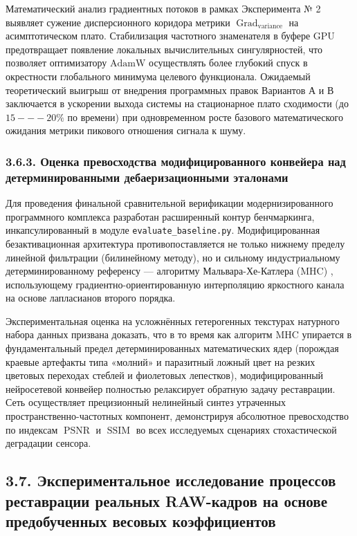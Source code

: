 \documentclass[12pt,a4paper]{article}
\begin{document}
Математический анализ градиентных потоков в рамках Эксперимента № 2 выявляет сужение дисперсионного коридора метрики $\operatorname{Grad}_{\operatorname{variance}}$ на асимптотическом плато. Стабилизация частотного знаменателя в буфере GPU предотвращает появление локальных вычислительных сингулярностей, что позволяет оптимизатору $\text{AdamW}$ осуществлять более глубокий спуск в окрестности глобального минимума целевого функционала. Ожидаемый теоретический выигрыш от внедрения программных правок Вариантов А и В заключается в ускорении выхода системы на стационарное плато сходимости (до $15---20\% $ по времени) при одновременном росте базового математического ожидания метрики пикового отношения сигнала к шуму.

\subsubsection{3.6.3. Оценка превосходства модифицированного конвейера над детерминированными дебаеризационными эталонами}

Для проведения финальной сравнительной верификации модернизированного программного комплекса разработан расширенный контур бенчмаркинга, инкапсулированный в модуле \texttt{evaluate\_baseline.py}. Модифицированная безактивационная архитектура противопоставляется не только нижнему пределу линейной фильтрации (билинейному методу), но и сильному индустриальному детерминированному референсу --- алгоритму Мальвара-Хе-Катлера ($\text{MHC}$) \cite{malvar2004high}, использующему градиентно-ориентированную интерполяцию яркостного канала на основе лапласианов второго порядка.

Экспериментальная оценка на усложнённых гетерогенных текстурах натурного набора данных призвана доказать, что в то время как алгоритм $\text{MHC}$ упирается в фундаментальный предел детерминированных математических ядер (порождая краевые артефакты типа «молний» и паразитный ложный цвет на резких цветовых переходах стеблей и фиолетовых лепестков), модифицированный нейросетевой конвейер полностью релаксирует обратную задачу реставрации. Сеть осуществляет прецизионный нелинейный синтез утраченных пространственно-частотных компонент, демонстрируя абсолютное превосходство по индексам $\operatorname{PSNR}$ и $\operatorname{SSIM}$ во всех исследуемых сценариях стохастической деградации сенсора.


\subsection{3.7. Экспериментальное исследование процессов реставрации реальных RAW-кадров на основе предобученных весовых коэффициентов}
\end{document}
